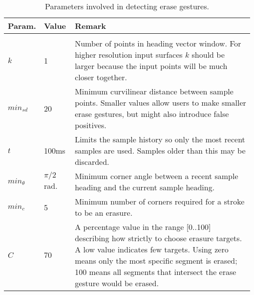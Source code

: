 
\begin{table}%
\centering
\begin{tabular}{p{1.5cm}| p{1.5cm} | p{12cm}}
\textbf{Param.} & \textbf{Value} & \textbf{Remark} 
\\ \hline
 & &
\\
$k$ &

1 &

Number of points in heading vector window. For higher resolution input
surfaces $k$ should be larger because the input points will be much
closer together.

\\

$min_{sd}$ & 

20 &

Minimum curvilinear distance between sample points. Smaller values
allow users to make smaller erase gestures, but might also introduce
false positives. 

\\

$t$ &

100ms &

Limits the sample history so only the most recent samples are
used. Samples older than this may be discarded.

\\

$min_\theta$ &

$\pi/2$ rad. &

Minimum corner angle between a recent sample heading and the current
sample heading. 

\\

$min_c$ &

5 &

Minimum number of corners required for a stroke to be an erasure.

\\

$C$ &

$70$ &

A percentage value in the range [0..100] describing how strictly to
choose erasure targets. A low value indicates few targets. Using zero
means only the most specific segment is erased; 100 means all segments
that intersect the erase gesture would be erased.

\end{tabular}
\caption{Parameters involved in detecting erase gestures.}
\label{tab:erase-params}
\end{table}
